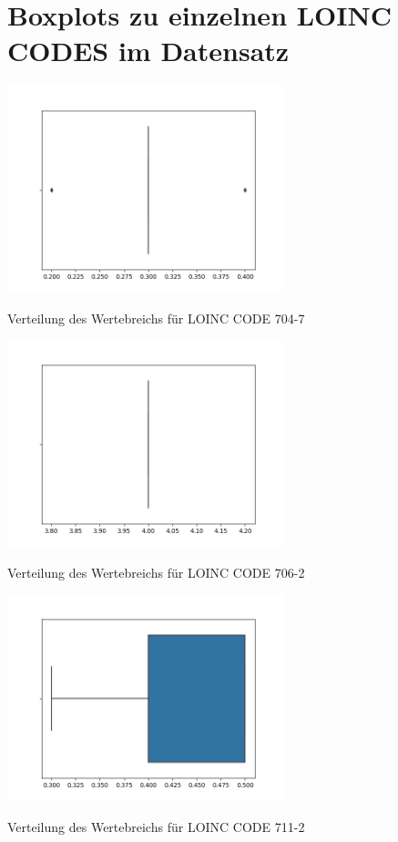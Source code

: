 \documentclass[12pt,a4paper,toc=bibliographynumbered,toc=indenttextentries]{scrreprt}
\begin{document}
		\section{Boxplots zu einzelnen LOINC CODES im Datensatz}
			\begin{center}
			\includegraphics[width=8cm]{Graphs/704-7.png}
			
			\small{Verteilung des Wertebreichs für LOINC CODE 704-7}
			
			\includegraphics[width=8cm]{Graphs/706-2.png}
			
			\small{Verteilung des Wertebreichs für LOINC CODE 706-2}
			
			\includegraphics[width=8cm]{Graphs/711-2.png}
			
			\small{Verteilung des Wertebreichs für LOINC CODE 711-2}
			

\end{center}
\end{document}
